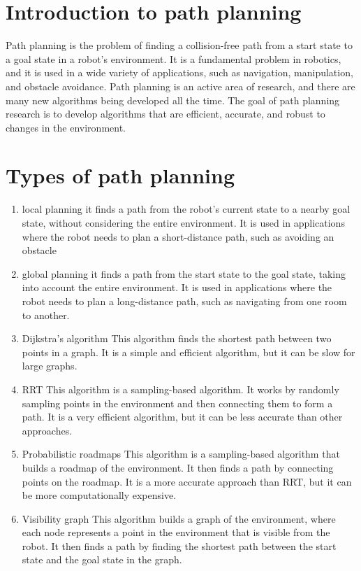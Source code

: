 \documentclass{article}
\begin{document}
\section{Introduction to path planning}
Path planning is the problem of finding a collision-free path from a start state to a goal state in a robot's environment. It is a fundamental problem in robotics, and it is used in a wide variety of applications, such as navigation, manipulation, and obstacle avoidance.
Path planning is an active area of research, and there are many new algorithms being developed all the time. The goal of path planning research is to develop algorithms that are efficient, accurate, and robust to changes in the environment.
\section{Types of path planning}
\begin{enumerate}
\item local planning
it finds a path from the robot's current state to a nearby goal state, without considering the entire environment. It is used in applications where the robot needs to plan a short-distance path, such as avoiding an obstacle
\item global planning
it finds a path from the start state to the goal state, taking into account the entire environment. It is used in applications where the robot needs to plan a long-distance path, such as navigating from one room to another.
\item Dijkstra's algorithm
This algorithm finds the shortest path between two points in a graph. It is a simple and efficient algorithm, but it can be slow for large graphs.
\item RRT
This algorithm is a sampling-based algorithm. It works by randomly sampling points in the environment and then connecting them to form a path. It is a very efficient algorithm, but it can be less accurate than other approaches.
\item Probabilistic roadmaps
This algorithm is a sampling-based algorithm that builds a roadmap of the environment. It then finds a path by connecting points on the roadmap. It is a more accurate approach than RRT, but it can be more computationally expensive.
\item Visibility graph
This algorithm builds a graph of the environment, where each node represents a point in the environment that is visible from the robot. It then finds a path by finding the shortest path between the start state and the goal state in the graph.
\end{enumerate}
\end{document}
